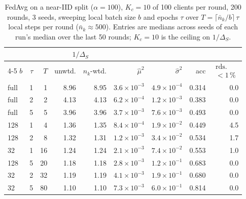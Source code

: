 \begin{table}[t]
  \centering
  \caption{FedAvg on a near-IID split ($\alpha=100$), $K_c=10$ of 100 clients per round, 200 rounds, 3 seeds, sweeping local batch size $b$ and epochs $\tau$ over $T=\lceil \bar{n}_k/b\rceil\,\tau$ local steps per round ($\bar{n}_k\approx500$). Entries are medians across seeds of each run's median over the last 50 rounds; $K_c=10$ is the ceiling on $1/\Delta_S$.}
  \label{tab:local-steps}
  \footnotesize
  \setlength{\tabcolsep}{2.5pt}
  \begin{tabular}{@{}lrrrrrrrr@{}}
    \toprule
    & & & \multicolumn{2}{c}{$1/\Delta_S$} & & & & \\
    \cmidrule(lr){4-5}
    $b$ & $\tau$ & $T$ & unwtd. & $n_k$-wtd. & $\hat{\mu}^2$ & $\hat{\sigma}^2$ & acc & $\substack{\text{rds.}\\<1\,\%}$ \\
    \midrule
    full & 1 & 1 & 8.96 & 8.95 & $3.6\times10^{-3}$ & $4.9\times10^{-4}$ & 0.314 & 0.0 \\
    full & 2 & 2 & 4.13 & 4.13 & $6.2\times10^{-4}$ & $1.2\times10^{-3}$ & 0.383 & 0.0 \\
    full & 5 & 5 & 3.96 & 3.96 & $3.7\times10^{-3}$ & $7.6\times10^{-3}$ & 0.493 & 0.0 \\
    \midrule
    128 & 1 & 4 & 1.36 & 1.35 & $8.4\times10^{-4}$ & $1.9\times10^{-2}$ & 0.449 & 4.5 \\
    128 & 2 & 8 & 1.32 & 1.31 & $1.2\times10^{-3}$ & $3.4\times10^{-2}$ & 0.534 & 1.7 \\
    32 & 1 & 16 & 1.24 & 1.24 & $2.1\times10^{-3}$ & $7.4\times10^{-2}$ & 0.553 & 1.0 \\
    128 & 5 & 20 & 1.18 & 1.18 & $2.8\times10^{-3}$ & $1.2\times10^{-1}$ & 0.683 & 0.0 \\
    32 & 2 & 32 & 1.19 & 1.19 & $4.1\times10^{-3}$ & $1.9\times10^{-1}$ & 0.680 & 0.0 \\
    32 & 5 & 80 & 1.10 & 1.10 & $7.3\times10^{-3}$ & $6.0\times10^{-1}$ & 0.814 & 0.0 \\
    \bottomrule
  \end{tabular}
\end{table}
